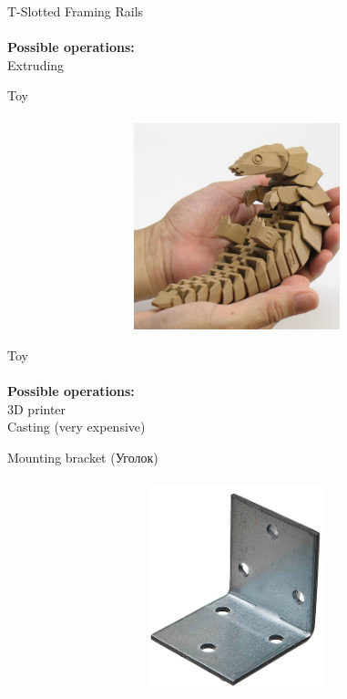 \documentclass[aspectratio=169]{beamer}
\begin{document}
\begin{frame}[c]{T-Slotted Framing Rails}
    \framesubtitle{}
        \LARGE \centering
        \textbf{Possible operations: } \\ 
        Extruding\\
    \end{frame}

\begin{frame}[c]{Toy}
\framesubtitle{}
    \vspace{-0.6cm}
    \begin{figure}[H]
        \centering\includegraphics[height=6cm,width=1\textwidth,keepaspectratio]{toy.png}
        \label{fig:toy.png}
    \end{figure}
\end{frame}

\begin{frame}[c]{Toy}
    \framesubtitle{}
        \LARGE \centering
        \textbf{Possible operations: } \\ 
        3D printer\\
        Casting (very expensive)
    \end{frame}

\begin{frame}[c]{Mounting bracket (Уголок)}
\framesubtitle{}
    \vspace{-0.6cm}
    \begin{figure}[H]
        \centering\includegraphics[height=6cm,width=1\textwidth,keepaspectratio]{angle.png}
        \label{fig:angle.png}
    \end{figure}
\end{frame}
\end{document}
